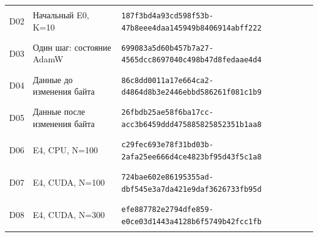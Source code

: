 \begin{longtable}{@{}l>{\raggedright\arraybackslash}p{3.7cm}p{10.8cm}@{}}
\hypertarget{D02}{D02} & Начальный E0, K=10 & {\fontsize{9.2}{11}\selectfont\texttt{187f3bd4a93cd598f53b-47b8eee4daa145949b8406914abff222}} \\
\hypertarget{D03}{D03} & Один шаг: состояние AdamW & {\fontsize{9.2}{11}\selectfont\texttt{699083a5d60b457b7a27-4565dcc8697040c498b47d8fedaae4d4}} \\
\hypertarget{D04}{D04} & Данные до изменения байта & {\fontsize{9.2}{11}\selectfont\texttt{86c8dd0011a17e664ca2-d4864d8b3e2446ebbd586261f081c1b9}} \\
\hypertarget{D05}{D05} & Данные после изменения байта & {\fontsize{9.2}{11}\selectfont\texttt{26fbdb25ae58f6ba17cc-acc3b6459ddd475885825852351b1aa8}} \\
\hypertarget{D06}{D06} & E4, CPU, N=100 & {\fontsize{9.2}{11}\selectfont\texttt{c29fec693e78f31bd03b-2afa25ee666d4ce4823bf95d43f5c1a8}} \\
\hypertarget{D07}{D07} & E4, CUDA, N=100 & {\fontsize{9.2}{11}\selectfont\texttt{724bae602e86195355ad-dbf545e3a7da421e9daf3626733fb95d}} \\
\hypertarget{D08}{D08} & E4, CUDA, N=300 & {\fontsize{9.2}{11}\selectfont\texttt{efe887782e2794dfe859-e0ce03d1443a4128b6f5749b42fcc1fb}} \\
\end{longtable}